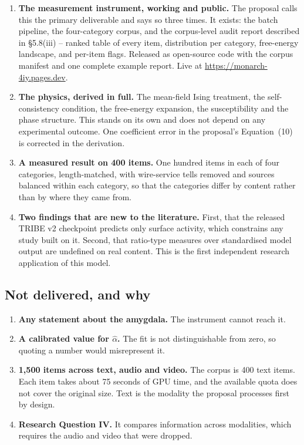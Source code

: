 \documentclass[11pt,a4paper]{article}
\begin{document}
\begin{enumerate}[leftmargin=1.6em]
\item \textbf{The measurement instrument, working and public.} The proposal calls
this the primary deliverable and says so three times. It exists: the batch pipeline,
the four-category corpus, and the corpus-level audit report described in
\S5.8(iii) -- ranked table of every item, distribution per category, free-energy
landscape, and per-item flags. Released as open-source code with the corpus manifest
and one complete example report. Live at \url{https://monarch-4iy.pages.dev}.

\item \textbf{The physics, derived in full.} The mean-field Ising treatment, the
self-consistency condition, the free-energy expansion, the susceptibility and the
phase structure. This stands on its own and does not depend on any experimental
outcome. One coefficient error in the proposal's Equation~(10) is corrected in the
derivation.

\item \textbf{A measured result on 400 items.} One hundred items in each of four
categories, length-matched, with wire-service tells removed and sources balanced
within each category, so that the categories differ by content rather than by where
they came from.

\item \textbf{Two findings that are new to the literature.} First, that the released
TRIBE v2 checkpoint predicts only surface activity, which constrains any study built
on it. Second, that ratio-type measures over standardised model output are undefined
on real content. This is the first independent research application of this model.
\end{enumerate}

\subsection{Not delivered, and why}

\begin{enumerate}[leftmargin=1.6em]
\item \textbf{Any statement about the amygdala.} The instrument cannot reach it.
\item \textbf{A calibrated value for $\hat{\alpha}$.} The fit is not distinguishable
from zero, so quoting a number would misrepresent it.
\item \textbf{1{,}500 items across text, audio and video.} The corpus is 400 text
items. Each item takes about 75 seconds of GPU time, and the available quota does
not cover the original size. Text is the modality the proposal processes first by
design.
\item \textbf{Research Question IV.} It compares information across modalities,
which requires the audio and video that were dropped.
\end{enumerate}
\end{document}
